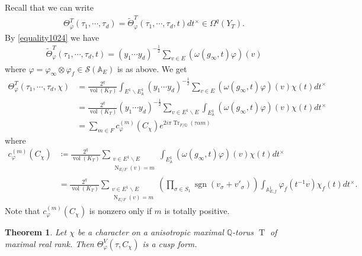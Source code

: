 \documentclass[11pt]{article} %
\newcommand{\8}{\infty}
\newcommand{\Tbf}{\operatorname{T}}
\newcommand{\A}{\mathbb{A}}
\newcommand{\Q}{\mathbb{Q}}
\newcommand{\vol}{\operatorname{vol}}
\newcommand{\Tr}{\operatorname{Tr}}
\newcommand{\N}{\operatorname{N}}
\newcommand{\sgn}{\operatorname{sgn}}
\newcommand{\Scal}{\mathcal{S}}
\newcommand{\fin}{f}
\newcommand{\thetil}{\widetilde{\Theta}}
\theoremstyle{mytheoremstyle}
\newtheorem{thm}{Theorem}[section]
\theoremstyle{remark}
\numberwithin{equation}{section}
\begin{document}
\subsubsection{} Recall that we can write
\begin{align} 
    \Theta^T_{\varphi}(\tau_1, \cdots, \tau_d)= \thetil^T_\varphi(\tau_1, \cdots, \tau_d,t)dt^\times \in \Omega^{q}(Y_T).
\end{align}
By \eqref{equality1024} we have
\begin{align}
\thetil^T_\varphi(\tau_1, \cdots, \tau_d,t)=  (y_1 \cdots y_d)^{-\frac{1}{2}} \sum_{v \in E}  (\omega(g_{\8},t)\varphi)(v)
\end{align}
where $\varphi=\varphi_\8 \otimes \varphi_\fin \in \Scal(\A_E)$ is as above. We get
\begin{align}
    \Theta^T_{\varphi}(\tau_1, \cdots, \tau_d,\chi) & = \frac{2^q}{\vol(K_{T})}\int_{E^1 \backslash E^1_\A} (y_1 \cdots y_d)^{-\frac{1}{2}} \sum_{v \in E}  (\omega(g_{\8},t)\varphi)(v) \chi(t) dt^\times \nonumber \\
    & = \frac{2^q}{\vol(K_{T})} (y_1 \cdots y_d)^{-\frac{1}{2}} \sum_{v \in E^1\backslash E}  \int_{E^1_\A}(\omega(g_{\8},t)\varphi)(v) \chi(t) dt^\times \nonumber \\
    & =  \sum_{m \in F} c^{(m)}_\varphi(C_\chi)e^{2 i \pi \Tr_{F/\Q}(\tau \alpha m)}
\end{align}
where 
\begin{align} \label{fouriercoeffexp}
 c^{(m)}_\varphi(C_\chi)  & \coloneqq \frac{2^q}{\vol(K_{T})} \sum_{\substack{v \in E^1 \backslash E \\ \N_{E/F}(v)=m}} \int_{E^1_\A}(\omega(g_{\8},t)\varphi)(v) \chi(t) dt^\times \nonumber \\
 & =  \frac{2^q}{\vol(K_{T})} \sum_{\substack{v \in E^1 \backslash E \\ \N_{E/F}(v)=m}} \left (\prod_{\sigma \in S_1} \sgn(v_\sigma+v'_\sigma) \right ) \int_{\A_{E,\fin}^1} \varphi_\fin(t^{-1}v)\chi_\fin(t)dt^\times.
\end{align}
Note that $c^{(m)}_\varphi(C_\chi)$ is nonzero only if $m$ is totally positive.
\begin{thm} Let $\chi$ be a character on a anisotropic maximal $\Q$-torus $\Tbf$ of maximal real rank. Then
$\Theta^V_{\varphi}(\tau,C_\chi)$ is a cusp form.
\end{thm}
\end{document}
